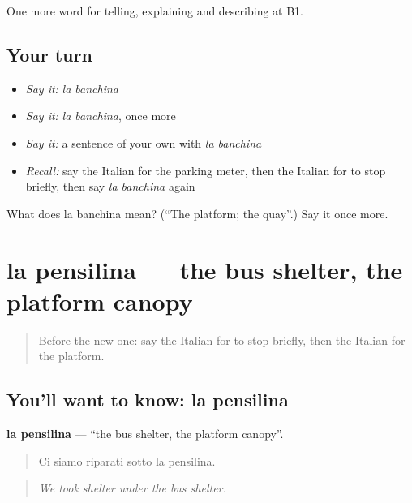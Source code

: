 \begin{grammarlens}[title={What you've built}]
One more word for telling, explaining and describing at B1.
\end{grammarlens}

\subsection*{Your turn}
\begin{itemize}
\raggedright
  \item \emph{Say it:} \emph{la banchina}
  \item \emph{Say it:} \emph{la banchina}, once more
  \item \emph{Say it:} a sentence of your own with \emph{la banchina}
  \item \emph{Recall:} say the Italian for the parking meter, then the Italian for to stop briefly, then say \emph{la banchina} again
\end{itemize}

\begin{tcolorbox}[breakable,colback=teal!4,colframe=teal!35!black,title={Before you move on}]
What does la banchina mean? (\textquotedblleft{}The platform; the quay\textquotedblright{}.) Say it once more.
\end{tcolorbox}
\section[la pensilina]{la pensilina — the bus shelter, the platform canopy}

\label{lesson:IT-C417-pensilina}



\begin{quote}
Before the new one: say the Italian for to stop briefly, then the Italian for the platform.
\end{quote}

\subsection*{You'll want to know: la pensilina}
\textbf{la pensilina} — \textquotedblleft{}the bus shelter, the platform canopy\textquotedblright{}.

\begin{quote}
Ci siamo riparati sotto la pensilina.
\end{quote}

\begin{quote}
\emph{We took shelter under the bus shelter.}
\end{quote}


